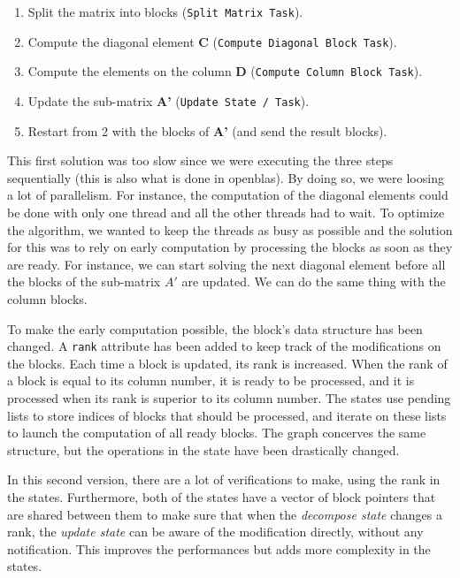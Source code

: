\begin{enumerate}
  \item Split the matrix into blocks (\texttt{Split Matrix Task}).
  \item Compute the diagonal element \textbf{C} (\texttt{Compute Diagonal Block Task}).
  \item Compute the elements on the column \textbf{D} (\texttt{Compute Column Block Task}).
  \item Update the sub-matrix \textbf{A'} (\texttt{Update State / Task}).
  \item Restart from 2 with the blocks of \textbf{A'} (and send the result
    blocks).
\end{enumerate}

This first solution was too slow since we were executing the three steps
sequentially (this is also what is done in openblas). By doing so, we were
loosing a lot of parallelism. For instance, the computation of the diagonal
elements could be done with only one thread and all the other threads had to
wait. To optimize the algorithm, we wanted to keep the threads as busy as
possible and the solution for this was to rely on early computation by
processing the blocks as soon as they are ready. For instance, we can start
solving the next diagonal element before all the blocks of the sub-matrix $A'$
are updated. We can do the same thing with the column blocks.

To make the early computation possible, the block's data structure has been
changed. A \texttt{rank} attribute has been added to keep track of the
modifications on the blocks. Each time a block is updated, its rank is
increased. When the rank of a block is equal to its column number, it is ready
to be processed, and it is processed when its rank is superior to its column
number. The states use pending lists to store indices of blocks that should be
processed, and iterate on these lists to launch the computation of all ready
blocks. The graph concerves the same structure, but the operations in the state
have been drastically changed.

In this second version, there are a lot of verifications to make, using the rank
in the states. Furthermore, both of the states have a vector of block pointers
that are shared between them to make sure that when the \textit{decompose state}
changes a rank, the \textit{update state} can be aware of the modification
directly, without any notification. This improves the performances but adds more
complexity in the states.

